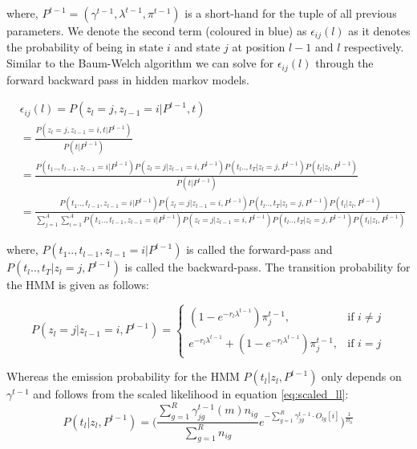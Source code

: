 where, $P^{t-1} = (\gamma^{t-1}, \lambda^{t-1}, \pi^{t-1})$ is a short-hand for the tuple of all previous parameters. We denote the second term (coloured in blue) as $\epsilon_{ij}(l)$ as it denotes the probability of being in state $i$ and state $j$ at position $l-1$ and $l$ respectively. Similar to the Baum-Welch algorithm we can solve for $\epsilon_{ij}(l)$ through the forward backward pass in hidden markov models. 

\begin{footnotesize}
\begin{align}
    &\epsilon_{ij}(l) =P(z_l = j, z_{l-1} = i \vert P^{t-1}, t) \nonumber \\
    &= \frac{P(z_l = j, z_{l-1} = i, t \vert P^{t-1})}{P(t \vert P^{t-1})} \nonumber \\
    &= \frac{P(t_1 .., t_{l-1}, z_{l-1}=i \vert P^{t-1}) P(z_l=j \vert z_{l-1}=i, P^{t-1}) P(t_{l} .., t_T \vert z_l=j, P^{t-1}) P(t_l \vert z_l, P^{t-1})}{P(t \vert P^{t-1})} \nonumber \\
    &= \frac{P(t_1 .., t_{l-1}, z_{l-1}=i \vert P^{t-1}) P(z_l=j \vert z_{l-1}=i, P^{t-1}) P(t_{l} .., t_T \vert z_l=j, P^{t-1}) P(t_l \vert z_l, P^{t-1})}{\sum\limits_{j=1}^{A}\sum\limits_{i=1}^{A} P(t_1 .., t_{l-1}, z_{l-1}=i \vert P^{t-1}) P(z_l=j \vert z_{l-1}=i, P^{t-1}) P(t_{l} .., t_T \vert z_l=j, P^{t-1}) P(t_l \vert z_l, P^{t-1})}
\label{eq:epsilon_ij}
\end{align}
\end{footnotesize}

 where, $P(t_1 .., t_{l-1}, z_{l-1}=i \vert P^{t-1})$ is called the forward-pass and $P(t_{l} .., t_T \vert z_l=j, P^{t-1})$ is called the backward-pass. The transition probability for the HMM is given as follows:

 \begin{equation}
     P(z_l=j \vert z_{l-1}=i, P^{t-1}) = \begin{cases} (1 - e^{-r_l \lambda^{t-1}})\pi_j^{t-1}, & \text{if } i \neq j \\ e^{-r_l \lambda^{t-1}} + (1 - e^{-r_l \lambda^{t-1}})\pi_j^{t-1} , & \text{if } i = j \end{cases}
 \end{equation}

Whereas the emission probability for the HMM $P(t_l \vert z_l, P^{t-1})$ only depends on $\gamma^{t-1}$ and follows from the scaled likelihood in equation \ref{eq:scaled_ll}:
\begin{equation}
   P(t_l \vert z_l, P^{t-1}) =  \Big( \frac{\sum_{g=1}^R\gamma^{t-1}_{jg}(m)n_{ig}}{\sum_{g=1}^R n_{ig}}e^{-\sum_{g=1}^R \gamma^{t-1}_{jg} \cdot O_{lg}[i]} \Big)^{\frac{1}{B_{li}}}
\end{equation}

